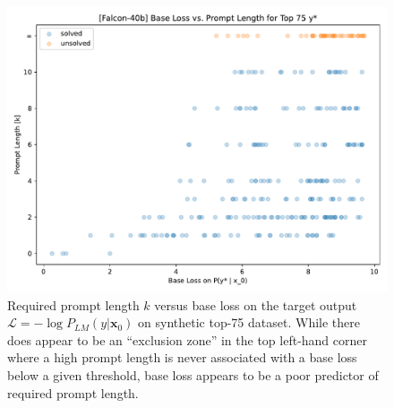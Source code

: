 \documentclass{article} %
\begin{document}
\begin{figure}[ht]
    
    \begin{minipage}[b]{0.48\textwidth}
        \caption{
            Required prompt length $k$ versus base loss on the target output $\mathcal L = -\log P_{LM}(y | \mathbf x_0)$ on synthetic top-75 dataset.
            While there does appear to be an ``exclusion zone'' in the top left-hand corner where a high prompt length is never associated with a base loss below a given threshold, base loss appears to be a poor predictor of required prompt length.
            \label{fig:base_loss_k_75}
        }
    \end{minipage}
    \hfill
    \begin{minipage}[b]{0.48\textwidth}
        \includegraphics[width=\textwidth]{figs/shallow1_falcon40b_base_loss_vs_prompt_length.pdf}
    \end{minipage}
\end{figure}
\end{document}

